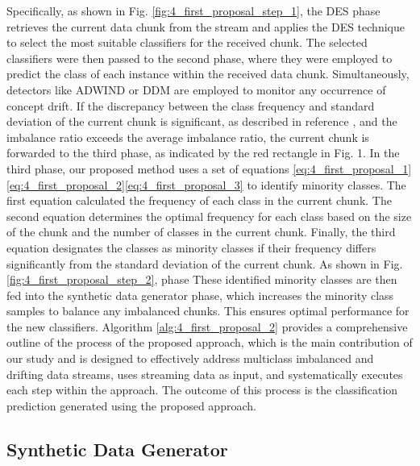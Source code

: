Specifically, as shown in Fig. \ref{fig:4_first_proposal_step_1}, the DES phase retrieves the current data chunk from the stream and applies the DES technique to select the most suitable classifiers for the received chunk. The selected classifiers were then passed to the second phase, where they were employed to predict the class of each instance within the received data chunk. Simultaneously, detectors like ADWIND or DDM are employed to monitor any occurrence of concept drift. If the discrepancy between the class frequency and standard deviation of the current chunk is significant, as described in reference \cite{gama2004learning}, and the imbalance ratio exceeds the average imbalance ratio, the current chunk is forwarded to the third phase, as indicated by the red rectangle in Fig. 1. In the third phase, our proposed method uses a set of equations 	\ref{eq:4_first_proposal_1}\ref{eq:4_first_proposal_2}\ref{eq:4_first_proposal_3}
to identify minority classes. The first equation calculated the frequency of each class in the current chunk. The second equation determines the optimal frequency for each class based on the size of the chunk and the number of classes in the current chunk. Finally, the third equation designates the classes as minority classes if their frequency differs significantly from the standard deviation of the current chunk.
As shown in Fig. \ref{fig:4_first_proposal_step_2}, phase These identified minority classes are then fed into the synthetic data generator phase, which increases the minority class samples to balance any imbalanced chunks. This ensures optimal performance for the new classifiers. Algorithm  \ref{alg:4_first_proposal_2} provides a comprehensive outline of the process of the proposed approach, which is the main contribution of our study and is designed to effectively address multiclass imbalanced and drifting data streams, uses streaming data as input, and systematically executes each step within the approach. The outcome of this process is the classification prediction generated using the proposed approach.


\subsection{Synthetic Data Generator}


